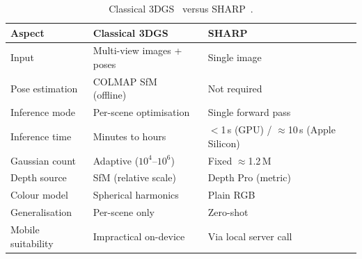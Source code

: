{%

\begin{table}[h]
\centering
\caption{Classical 3DGS~\cite{kerbl20233dgs} versus SHARP~\cite{sharp-monocular-view}.}
\label{tab:3dgs_vs_sharp}
\setlength{\tabcolsep}{4pt}
\begin{tabular}{p{2.8cm} p{4.3cm} p{4.3cm}}
\toprule
\textbf{Aspect} & \textbf{Classical 3DGS} & \textbf{SHARP} \\
\midrule
Input             & Multi-view images + poses & Single image \\
Pose estimation   & COLMAP SfM (offline)~\cite{SSF16} & Not required \\
Inference mode    & Per-scene optimisation    & Single forward pass \\
Inference time    & Minutes to hours          & ${<}$1\,s (GPU) / ${\approx}$10\,s (Apple Silicon) \\
Gaussian count    & Adaptive ($10^4$--$10^6$) & Fixed ${\approx}$1.2\,M \\
Depth source      & SfM (relative scale)      & Depth Pro (metric)~\cite{BDGZ25} \\
Colour model      & Spherical harmonics       & Plain RGB \\
Generalisation    & Per-scene only            & Zero-shot \\
Mobile suitability & Impractical on-device   & Via local server call \\
\bottomrule
\end{tabular}
\end{table}

}
